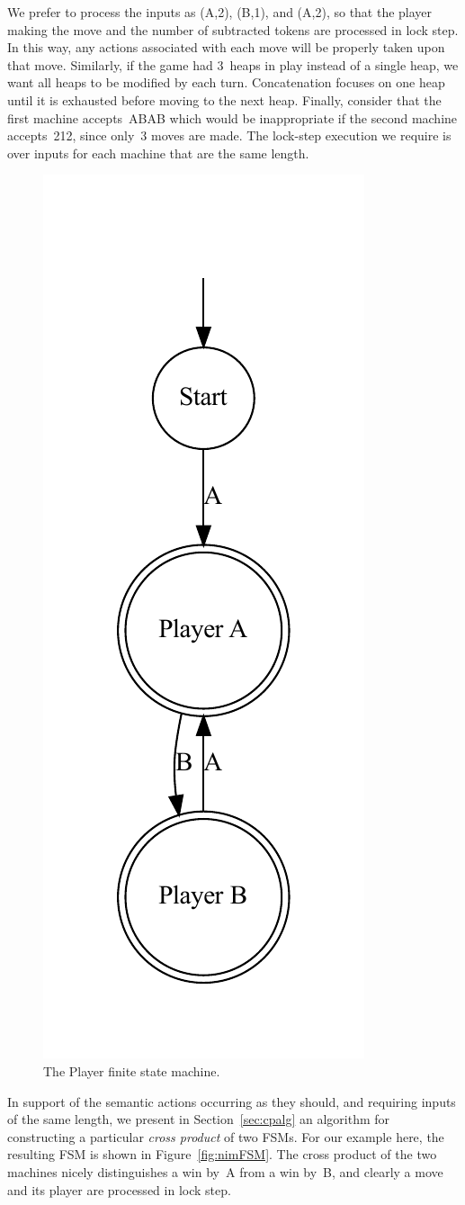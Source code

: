 \documentclass[sigplan,anonymous,review]{acmart}
\begin{document}
We prefer to process the inputs as (A,2), (B,1), and (A,2), so that the player making the move and the number of subtracted tokens are processed in lock step.  In this way, any actions associated with each move will be properly taken upon that move.  Similarly, if the game had 3~heaps in play instead of a single heap, we want all heaps to be modified by each turn.  Concatenation focuses on one heap until it is exhausted before moving to the next heap.   Finally, consider that the first machine accepts~ABAB which would be inappropriate if the second machine accepts~212, since only~3 moves are made.  The lock-step execution we require is over inputs for each machine that are the same length.

\begin{figure}
    \centering
    \includegraphics[width=0.35\linewidth]{figures/nimexample/playerFSM.pdf}
    \caption{The Player finite state machine.}
    \label{fig:nimPlayerFSM}
\end{figure}

In support of the semantic actions occurring as they should, and requiring inputs of the same length, we present in Section~\ref{sec:cpalg} an algorithm for constructing a particular \emph{cross product} of two FSMs.  For our example here, the resulting FSM is shown in Figure~\ref{fig:nimFSM}.  The cross product of the two machines nicely distinguishes a win by~A from a win by~B, and clearly a move and its player are processed in lock step.
\end{document}
